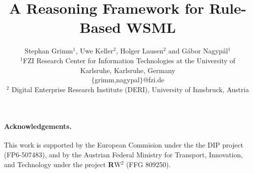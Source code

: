 \documentclass[times, 10pt,twocolumn]{article}
\begin{document}


\title{A Reasoning Framework for Rule-Based WSML}

\author{Stephan Grimm$^1$, Uwe Keller$^2$, Holger Lausen$^2$ and G\'abor Nagyp\'al$^1$\\
\normalsize $^1$FZI Research Center for Information
Technologies at the University of Karlsruhe, Karlsruhe, Germany\\
\normalsize \sf $\{$grimm,nagypal$\}$@fzi.de\\[1mm]
\normalsize $^2$ Digital Enterprise Research Institute (DERI),
 University of Innsbruck, Austria\\ \normalsize {} }

\maketitle

\begin{abstract}

\end{abstract}









\paragraph{Acknowledgements.}
This work is supported by the European Commision under the the DIP
project (FP6-507483), and by the Austrian Federal Ministry for
Transport, Innovation, and Technology under the project {\sffamily
{\bfseries R}W$^{\mathsf{2}}$} (FFG 809250).



\end{document}
